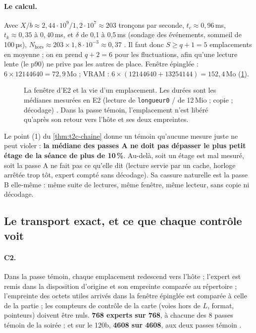 \paragraph{Le calcul.} Avec $X/b \approx 2{,}44\cdot10^{9} / 1{,}2\cdot10^{7} \approx 203$ tronçons par seconde, $t_c \approx 0{,}96$\,ms, $t_k \approx 0{,}35$ à $0{,}40$\,ms, et $\delta$ de 0,1 à 0,5\,ms (sondage des événements, sommeil de 100\,µs), $N_{\mathrm{hors}} \approx 203 \times 1{,}8\cdot10^{-3} \approx 0{,}37$ \calc. Il faut donc $S \ge q + 1 = 5$ emplacements en moyenne ; on en prend $q + 2 = 6$ pour les fluctuations, afin qu'une lecture lente (le p90) ne prive pas les autres de place. Fenêtre épinglée : $6 \times \num{12144640} = 72{,}9$\,Mo ; VRAM : $6 \times (\num{12144640} + \num{13254144}) = 152{,}4$\,Mo (\cref{fig:t2c-fenetre}).

\begin{figure}[ht]
\centering
\SchemaChmFenetre
\caption[La fenêtre d'E2 et la vie d'un emplacement]{La fenêtre d'E2 et la vie d'un emplacement. Les durées sont les médianes mesurées en E2 (lecture de \texttt{longueur0} / de 12\,Mio ; copie ; décodage) \mes. Dans la passe témoin, l'emplacement n'est libéré qu'après son retour vers l'hôte et ses deux empreintes.}
\label{fig:t2c-fenetre}
\end{figure}

Le point (1) du \cref{thm:t2c-chaine} donne un témoin qu'aucune mesure juste ne peut violer : \textbf{la médiane des passes A ne doit pas dépasser le plus petit étage de la séance de plus de 10\,\%}. Au-delà, soit un étage est mal mesuré, soit la passe A ne fait pas ce qu'elle dit (lecture servie par un cache, horloge arrêtée trop tôt, expert compté sans décodage). Sa cassure naturelle est la passe B elle-même : même suite de lectures, même fenêtre, même lecteur, sans copie ni décodage.

\subsection{Le transport exact, et ce que chaque contrôle voit}

\paragraph{C2.} Dans la passe témoin, chaque emplacement redescend vers l'hôte ; l'expert est remis dans la disposition d'origine et son empreinte comparée au répertoire ; l'empreinte des octets utiles arrivés dans la fenêtre épinglée est comparée à celle de la partie ; les compteurs de contrôle de la carte (voies hors de $L$, format, pointeurs) doivent être nuls. \textbf{768 experts sur 768}, à chacune des 8 passes témoin de la soirée ; et sur le 120b, \textbf{\num{4608} sur \num{4608}}, aux deux passes témoin \mes.

